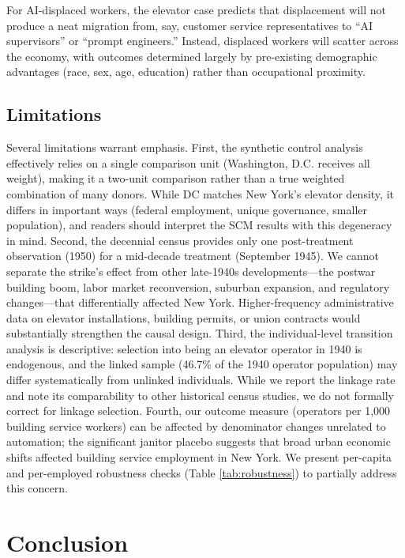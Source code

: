 \documentclass[12pt]{article}
\begin{document}
For AI-displaced workers, the elevator case predicts that displacement will not produce a neat migration from, say, customer service representatives to ``AI supervisors'' or ``prompt engineers.'' Instead, displaced workers will scatter across the economy, with outcomes determined largely by pre-existing demographic advantages (race, sex, age, education) rather than occupational proximity.


\subsection{Limitations}

Several limitations warrant emphasis. First, the synthetic control analysis effectively relies on a single comparison unit (Washington, D.C. receives all weight), making it a two-unit comparison rather than a true weighted combination of many donors. While DC matches New York's elevator density, it differs in important ways (federal employment, unique governance, smaller population), and readers should interpret the SCM results with this degeneracy in mind. Second, the decennial census provides only one post-treatment observation (1950) for a mid-decade treatment (September 1945). We cannot separate the strike's effect from other late-1940s developments---the postwar building boom, labor market reconversion, suburban expansion, and regulatory changes---that differentially affected New York. Higher-frequency administrative data on elevator installations, building permits, or union contracts would substantially strengthen the causal design. Third, the individual-level transition analysis is descriptive: selection into being an elevator operator in 1940 is endogenous, and the linked sample (46.7\% of the 1940 operator population) may differ systematically from unlinked individuals. While we report the linkage rate and note its comparability to other historical census studies, we do not formally correct for linkage selection. Fourth, our outcome measure (operators per 1,000 building service workers) can be affected by denominator changes unrelated to automation; the significant janitor placebo suggests that broad urban economic shifts affected building service employment in New York. We present per-capita and per-employed robustness checks (Table \ref{tab:robustness}) to partially address this concern.

\section{Conclusion}
\end{document}
